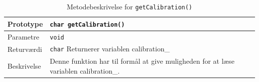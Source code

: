 \begin{table}[h]
\begin{tabularx}{\textwidth}{| L{2.5 cm} | Z |} \hline
Prototype 	& \texttt{char getCalibration()} \\\hline
Parametre 	& \texttt{void}			\newline \\\hline
Returværdi	& \texttt{char} 		\newline Returnerer variablen calibration\_\\\hline
Beskrivelse	& Denne funktion har til formål at give muligheden for at læse variablen calibration\_.\newline \\\hline
\end{tabularx}
\caption{Metodebeskrivelse for \texttt{getCalibration()}}
\label{table:met_getcalibration}
\end{table}